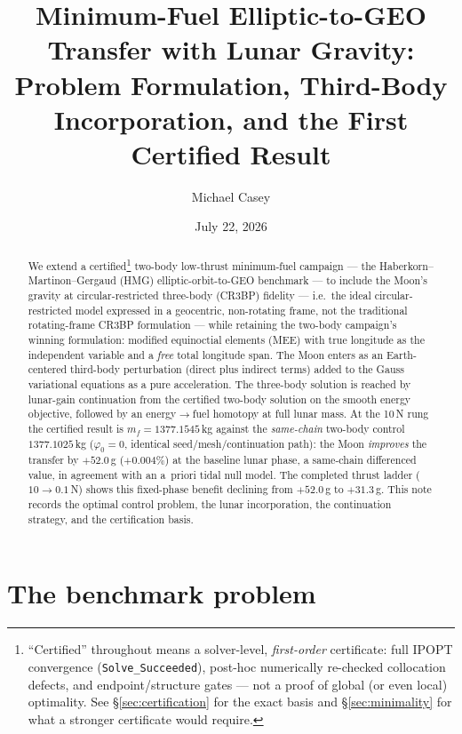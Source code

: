 \documentclass[11pt]{article}
\title{Minimum-Fuel Elliptic-to-GEO Transfer with Lunar Gravity:\\
Problem Formulation, Third-Body Incorporation, and the First Certified Result}
\author{Michael Casey}
\date{July 22, 2026}
\begin{document}
\maketitle

\begin{abstract}
We extend a certified\footnote{``Certified'' throughout means a
solver-level, \emph{first-order} certificate: full IPOPT convergence
(\texttt{Solve\_Succeeded}), post-hoc numerically re-checked collocation
defects, and endpoint/structure gates --- not a proof of global (or even
local) optimality. See \S\ref{sec:certification} for the exact basis and
\S\ref{sec:minimality} for what a stronger certificate would require.}
two-body low-thrust minimum-fuel campaign --- the
Haberkorn--Martinon--Gergaud (HMG) elliptic-orbit-to-GEO benchmark --- to
include the Moon's gravity at circular-restricted three-body (CR3BP)
fidelity --- i.e.\ the ideal circular-restricted model expressed in a
geocentric, non-rotating frame, not the traditional rotating-frame CR3BP
formulation --- while retaining the two-body campaign's winning
formulation: modified equinoctial elements (MEE) with true longitude as
the independent variable and a \emph{free} total longitude span. The Moon
enters as an Earth-centered third-body perturbation (direct plus indirect
terms) added to the Gauss variational equations as a pure acceleration.
The three-body solution is reached by lunar-gain continuation from the
certified two-body solution on the smooth energy objective, followed by an
energy$\to$fuel homotopy at full lunar mass. At the 10\,N rung the certified
result is $m_f = 1377.1545$\,kg against the \emph{same-chain} two-body
control $1377.1025$\,kg ($\varphi_0 = 0$, identical seed/mesh/continuation
path): the Moon \emph{improves} the transfer by $+52.0$\,g ($+0.004\%$) at
the baseline lunar phase, a same-chain differenced value, in agreement with
an a~priori tidal null model. The completed thrust ladder ($10 \to 0.1$\,N)
shows this fixed-phase benefit declining from $+52.0$\,g to $+31.3$\,g. This
note records the optimal control problem, the lunar incorporation, the
continuation strategy, and the certification basis.
\end{abstract}

\section{The benchmark problem}
\label{sec:benchmark}
\end{document}
